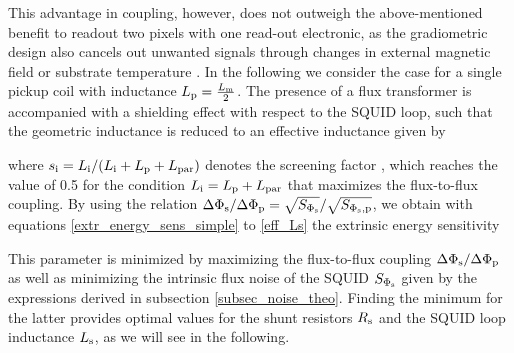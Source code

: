 
This advantage in coupling, however, does not outweigh the above-mentioned benefit to readout two pixels with one read-out electronic, as the gradiometric design also cancels out unwanted signals through changes in external magnetic field or substrate temperature \cite{Fleischmann2005}. In the following we consider the case for a single pickup coil with inductance $L_{\rm p}=\frac{L_{\rm m}}{2}$. The presence of a flux transformer is accompanied with a shielding effect with respect to the SQUID loop, such that the geometric inductance is reduced to an effective inductance given by \cite{Gross2016} 


where $s_{\rm i}=L_{\rm i}/(L_{\rm i} + L_{\rm p} + L_{\rm par})$ denotes the screening factor \cite{Clarke2004}, which reaches the value of 0.5 for the condition $L_{\rm i}=L_{\rm p}+L_{\rm par}$ that maximizes the flux-to-flux coupling. By using the relation $\Delta\Phi_{\rm s}/\Delta\Phi_{\rm p}=\sqrt{S_{\rm \Phi_s}}/\sqrt{S_{\rm \Phi_s,p}}$, we obtain with equations \ref{extr_energy_sens_simple} to \ref{eff_Ls} the extrinsic energy sensitivity \cite{Knuutila1988}


This parameter is minimized by maximizing the flux-to-flux coupling $\Delta\Phi_{\rm s}/\Delta\Phi_{\rm p}$ as well as minimizing the intrinsic flux noise of the SQUID $S_{\rm \Phi_s}$ given by the expressions derived in subsection \ref{subsec_noise_theo}. Finding the minimum for the latter provides optimal values for the shunt resistors $R_{\rm s}$ and the SQUID loop inductance $L_{\rm s}$, as we will see in the following.

